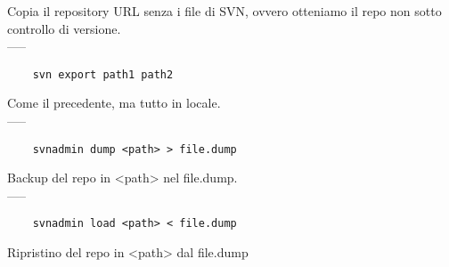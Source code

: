 \documentclass[a4paper]{article}
\begin{document}
	Copia il repository URL senza i file di SVN, ovvero otteniamo il repo non sotto controllo di versione.\\-----
	\begin{verbatim}
	svn export path1 path2
	\end{verbatim}
	Come il precedente, ma tutto in locale.\\-----
	\begin{verbatim}
	svnadmin dump <path> > file.dump
	\end{verbatim}
	Backup del repo in <path> nel file.dump.\\-----
	\begin{verbatim}
	svnadmin load <path> < file.dump
	\end{verbatim}
	Ripristino del repo in <path> dal file.dump
	
	
\end{document}
